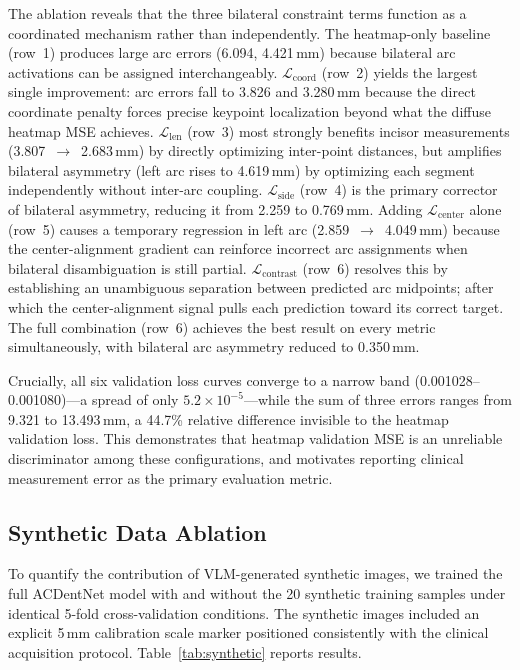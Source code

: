 \documentclass[conference]{IEEEtran}
\begin{document}
The ablation reveals that the three bilateral constraint terms function as a coordinated
mechanism rather than independently. The heatmap-only baseline (row~1) produces large arc
errors (6.094, 4.421\,mm) because bilateral arc activations can be assigned interchangeably.
$\mathcal{L}_{\text{coord}}$ (row~2) yields the largest single improvement: arc errors fall
to 3.826 and 3.280\,mm because the direct coordinate penalty forces precise keypoint
localization beyond what the diffuse heatmap MSE achieves. $\mathcal{L}_{\text{len}}$ (row~3)
most strongly benefits incisor measurements (3.807~$\to$~2.683\,mm) by directly optimizing
inter-point distances, but amplifies bilateral asymmetry (left arc rises to 4.619\,mm) by
optimizing each segment independently without inter-arc coupling.
$\mathcal{L}_{\text{side}}$ (row~4) is the primary corrector of bilateral asymmetry, reducing
it from 2.259 to 0.769\,mm. Adding $\mathcal{L}_{\text{center}}$ alone (row~5) causes a
temporary regression in left arc (2.859~$\to$~4.049\,mm) because the center-alignment gradient
can reinforce incorrect arc assignments when bilateral disambiguation is still partial.
$\mathcal{L}_{\text{contrast}}$ (row~6) resolves this by establishing an unambiguous
separation between predicted arc midpoints; after which the center-alignment signal pulls each
prediction toward its correct target. The full combination (row~6) achieves the best result
on every metric simultaneously, with bilateral arc asymmetry reduced to 0.350\,mm.

Crucially, all six validation loss curves converge to a narrow band
(0.001028--0.001080)---a spread of only $5.2{\times}10^{-5}$---while the sum of three errors
ranges from 9.321 to 13.493\,mm, a 44.7\% relative difference invisible to the heatmap
validation loss. This demonstrates that heatmap validation MSE is an unreliable discriminator
among these configurations, and motivates reporting clinical measurement error as the primary
evaluation metric.

\subsection{Synthetic Data Ablation}
\label{sec:synthetic}

To quantify the contribution of VLM-generated synthetic images, we trained the full ACDentNet
model with and without the 20 synthetic training samples under identical 5-fold cross-validation
conditions. The synthetic images included an explicit 5\,mm calibration scale marker positioned
consistently with the clinical acquisition protocol. Table~\ref{tab:synthetic} reports results.
\end{document}
